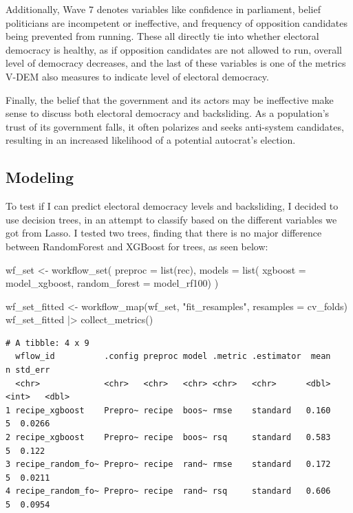 \documentclass[
  letterpaper,
  DIV=11,
  numbers=noendperiod]{scrartcl}
\newenvironment{Shaded}{\begin{snugshade}}{\end{snugshade}}
\newcommand{\AttributeTok}[1]{\textcolor[rgb]{0.40,0.45,0.13}{#1}}
\newcommand{\FunctionTok}[1]{\textcolor[rgb]{0.28,0.35,0.67}{#1}}
\newcommand{\NormalTok}[1]{\textcolor[rgb]{0.00,0.23,0.31}{#1}}
\newcommand{\OtherTok}[1]{\textcolor[rgb]{0.00,0.23,0.31}{#1}}
\newcommand{\SpecialCharTok}[1]{\textcolor[rgb]{0.37,0.37,0.37}{#1}}
\newcommand{\StringTok}[1]{\textcolor[rgb]{0.13,0.47,0.30}{#1}}
\begin{document}
Additionally, Wave 7 denotes variables like confidence in parliament,
belief politicians are incompetent or ineffective, and frequency of
opposition candidates being prevented from running. These all directly
tie into whether electoral democracy is healthy, as if opposition
candidates are not allowed to run, overall level of democracy decreases,
and the last of these variables is one of the metrics V-DEM also
measures to indicate level of electoral democracy.

Finally, the belief that the government and its actors may be
ineffective make sense to discuss both electoral democracy and
backsliding. As a population's trust of its government falls, it often
polarizes and seeks anti-system candidates, resulting in an increased
likelihood of a potential autocrat's election.

\subsection{Modeling}\label{modeling}

To test if I can predict electoral democracy levels and backsliding, I
decided to use decision trees, in an attempt to classify based on the
different variables we got from Lasso. I tested two trees, finding that
there is no major difference between RandomForest and XGBoost for trees,
as seen below:

\begin{Shaded}
\begin{Highlighting}[]
\NormalTok{wf\_set }\OtherTok{\textless{}{-}} \FunctionTok{workflow\_set}\NormalTok{(}
  \AttributeTok{preproc =} \FunctionTok{list}\NormalTok{(rec),}
  \AttributeTok{models =} \FunctionTok{list}\NormalTok{(}
    \AttributeTok{xgboost =}\NormalTok{ model\_xgboost,}
    \AttributeTok{random\_forest =}\NormalTok{ model\_rf100)}
\NormalTok{)}
  
\NormalTok{wf\_set\_fitted }\OtherTok{\textless{}{-}} \FunctionTok{workflow\_map}\NormalTok{(wf\_set, }\StringTok{"fit\_resamples"}\NormalTok{, }\AttributeTok{resamples =}\NormalTok{ cv\_folds)}
\NormalTok{wf\_set\_fitted }\SpecialCharTok{|\textgreater{}} \FunctionTok{collect\_metrics}\NormalTok{()}
\end{Highlighting}
\end{Shaded}

\begin{verbatim}
# A tibble: 4 x 9
  wflow_id          .config preproc model .metric .estimator  mean     n std_err
  <chr>             <chr>   <chr>   <chr> <chr>   <chr>      <dbl> <int>   <dbl>
1 recipe_xgboost    Prepro~ recipe  boos~ rmse    standard   0.160     5  0.0266
2 recipe_xgboost    Prepro~ recipe  boos~ rsq     standard   0.583     5  0.122 
3 recipe_random_fo~ Prepro~ recipe  rand~ rmse    standard   0.172     5  0.0211
4 recipe_random_fo~ Prepro~ recipe  rand~ rsq     standard   0.606     5  0.0954
\end{verbatim}
\end{document}
